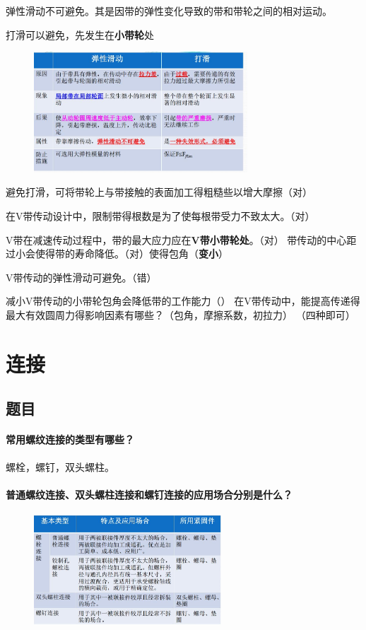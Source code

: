 \documentclass[twocolumn]{ctexart}
\begin{document}
\begin{description}[leftmargin=1.7cm,style=nextline,nosep]%
  \item[弹性滑动] 弹性滑动不可避免。其是因带的弹性变化导致的带和带轮之间的相对运动。
  \item[打滑] 打滑可以避免，先发生在\textbf{小带轮}处  
\end{description}
        \begin{figure}[H]
            \centering
            \includegraphics[width=8cm]{img/17.png}
            \end{figure}
避免打滑，可将带轮上与带接触的表面加工得粗糙些以增大摩擦（对）


在V带传动设计中，限制带得根数是为了使每根带受力不致太大。（对）


V带在减速传动过程中，带的最大应力应在\textbf{V带小带轮处}。（对）
带传动的中心距过小会使得带的寿命降低。（对）使得包角（\textbf{变小}）

V带传动的弹性滑动可避免。（错）

减小V带传动的小带轮包角会降低带的工作能力（）
在V带传动中，能提高传递得最大有效圆周力得影响因素有哪些？（包角，摩擦系数，初拉力）
（四种即可）
\section{连接}

\subsection{题目}
\paragraph{常用螺纹连接的类型有哪些？}
螺栓，螺钉，双头螺柱。
\paragraph{普通螺纹连接、双头螺柱连接和螺钉连接的应用场合分别是什么？}
        \begin{figure}[H]
            \centering
            \includegraphics[width=7cm]{img/18.png}
            \end{figure}
\end{document}
